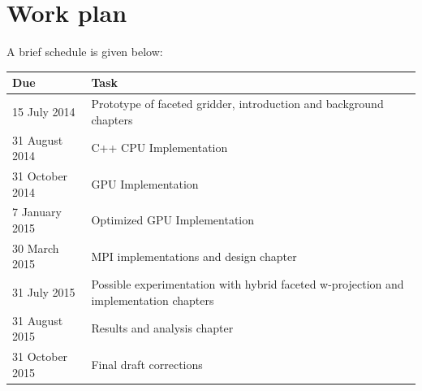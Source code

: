 \documentclass[a4paper, two column]{article}
\begin{document}
\section{Work plan}
A brief schedule is given below:\\
\begin{tabular}{|p{2.5cm}|p{5cm}|}
 \hline
 \textbf{Due} & \textbf{Task} \\
 \hline
 15 July 2014 & Prototype of faceted gridder, introduction and background chapters\\
 \hline
 31 August 2014 & C++ CPU Implementation\\
 \hline
 31 October 2014 & GPU Implementation\\
 \hline
 7 January 2015 & Optimized GPU Implementation\\
 \hline
 30 March 2015 & MPI implementations and design chapter\\
 \hline
 31 July 2015 & Possible experimentation with hybrid faceted w-projection and implementation chapters\\
 \hline
 31 August 2015 & Results and analysis chapter\\
 \hline
 31 October 2015 & Final draft corrections \\
 \hline
\end{tabular}
{
{\footnotesize }

}
\end{document}

